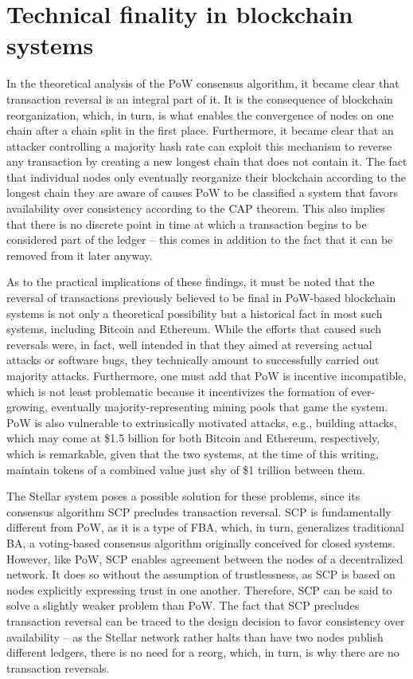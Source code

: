 \section{Technical finality in blockchain systems}

In the theoretical analysis of the PoW consensus algorithm, it became clear that transaction reversal is an integral part of it.
It is the consequence of blockchain reorganization, which, in turn, is what enables the convergence of nodes on one chain after a chain split in the first place.
Furthermore, it became clear that an attacker controlling a majority hash rate can exploit this mechanism to reverse any transaction by creating a new longest chain that does not contain it.
The fact that individual nodes only eventually reorganize their blockchain according to the longest chain they are aware of causes PoW to be classified a system that favors availability over consistency according to the CAP theorem.
This also implies that there is no discrete point in time at which a transaction begins to be considered part of the ledger -- this comes in addition to the fact that it can be removed from it later anyway.

As to the practical implications of these findings, it must be noted that the reversal of transactions previously believed to be final in PoW-based blockchain systems is not only a theoretical possibility but a historical fact in most such systems, including Bitcoin and Ethereum.
While the efforts that caused such reversals were, in fact, well intended in that they aimed at reversing actual attacks or software bugs, they technically amount to successfully carried out majority attacks.
Furthermore, one must add that PoW is incentive incompatible, which is not least problematic because it incentivizes the formation of ever-growing, eventually majority-representing mining pools that game the system.
PoW is also vulnerable to extrinsically motivated attacks, e.g., building attacks, which may come at \$1.5 billion for both Bitcoin and Ethereum, respectively, which is remarkable, given that the two systems, at the time of this writing, maintain tokens of a combined value just shy of \$1 trillion between them.

The Stellar system poses a possible solution for these problems, since its consensus algorithm SCP precludes transaction reversal.
SCP is fundamentally different from PoW, as it is a type of FBA, which, in turn, generalizes traditional BA, a voting-based consensus algorithm originally conceived for closed systems.
However, like PoW, SCP enables agreement between the nodes of a decentralized network.
It does so without the assumption of trustlessness, as SCP is based on nodes explicitly expressing trust in one another.
Therefore, SCP can be said to solve a slightly weaker problem than PoW.
The fact that SCP precludes transaction reversal can be traced to the design decision to favor consistency over availability -- as the Stellar network rather halts than have two nodes publish different ledgers, there is no need for a reorg, which, in turn, is why there are no transaction reversals.

